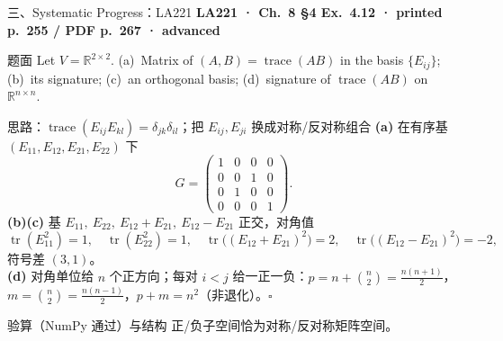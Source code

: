 \documentclass[aspectratio=169,10pt,fontset=none]{ctexbeamer}
\newcommand{\ex}[1]{\textcolor{accent}{\footnotesize\bfseries #1}}
\begin{document}
\begin{frame}[t]{三、Systematic Progress：LA221}
  \leavevmode\ex{LA221 · Ch.~8 §4 Ex.~4.12 · printed p.~255 / PDF p.~267 · advanced}
  \begin{block}{\footnotesize 题面}
    \scriptsize Let $V=\mathbb R^{2\times2}$. (a)~Matrix of $(A,B)=\operatorname{trace}(AB)$ in the basis $\{E_{ij}\}$; (b)~its signature; (c)~an orthogonal basis; (d)~signature of $\operatorname{trace}(AB)$ on $\mathbb R^{n\times n}$.
  \end{block}
  \begin{exampleblock}{\footnotesize 思路：$\operatorname{trace}(E_{ij}E_{kl})=\delta_{jk}\delta_{il}$；把 $E_{ij},E_{ji}$ 换成对称/反对称组合}
    \scriptsize
    \textbf{(a)} 在有序基 $(E_{11},E_{12},E_{21},E_{22})$ 下
    $$G=\begin{pmatrix}1&0&0&0\\0&0&1&0\\0&1&0&0\\0&0&0&1\end{pmatrix}.$$
    \textbf{(b)(c)} 基 $E_{11},\ E_{22},\ E_{12}+E_{21},\ E_{12}-E_{21}$ 正交，对角值
    $$\operatorname{tr}(E_{11}^2)=1,\quad \operatorname{tr}(E_{22}^2)=1,\quad \operatorname{tr}\big((E_{12}+E_{21})^2\big)=2,\quad \operatorname{tr}\big((E_{12}-E_{21})^2\big)=-2,$$
    符号差 $\boxed{(3,1)}$。\\
    \textbf{(d)} 对角单位给 $n$ 个正方向；每对 $i<j$ 给一正一负：$p=n+\binom n2=\frac{n(n+1)}2$，$m=\binom n2=\frac{n(n-1)}2$，$p+m=n^2$（非退化）。$\square$
  \end{exampleblock}
  \begin{block}{\footnotesize 验算（NumPy 通过）与结构}
    \scriptsize 正/负子空间恰为对称/反对称矩阵空间。
  \end{block}
\end{frame}
\end{document}
